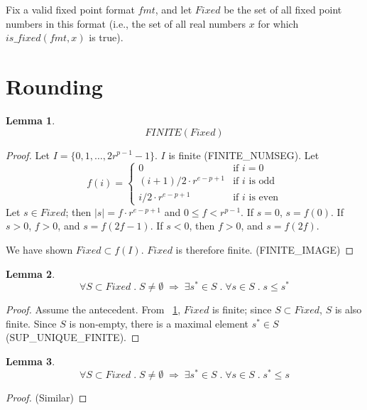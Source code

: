 \documentclass{article}
\begin{document}
\theoremstyle{definition}
\newtheorem{thm}{Theorem}[section]
\newtheorem{lem}[thm]{Lemma}

Fix a valid fixed point format $fmt$, and let $Fixed$ be the set of all 
fixed point numbers in this format (i.e., the set of all real numbers $x$ for 
which $is\_fixed(fmt,x)$ is true).

\section{Rounding}

\begin{lem}
\label{fixedfinite}
\begin{equation*}
FINITE(Fixed)
\end{equation*}
\begin{proof} Let $I = \{0, 1, \ldots, 2r^{p - 1} - 1\}$. $I$ is finite 
(FINITE\_NUMSEG). Let
\begin{equation*}
f(i) = \left \{
\begin{array}{ll}
0 & \text{if $i = 0$}\\
(i + 1)/2 \cdot r^{e - p + 1} & \text{if $i$ is odd}\\
i/2 \cdot r^{e - p + 1} & \text{if $i$ is even}
\end{array} \right .
\end{equation*}
Let $s \in Fixed$; then $|s| = f \cdot r^{e - p + 1}$ and $0 \leq f < r^{p - 1}$.
If $s = 0$, $s = f(0)$. If $s > 0$, $f > 0$, and $s = f(2f - 1)$. If $s < 0$,
then $f > 0$, and $s = f(2f)$.

We have shown $Fixed \subset f(I)$. $Fixed$ is therefore finite. (FINITE\_IMAGE)
\end{proof}
\end{lem}

\begin{lem}
\label{greatestexists}
\begin{equation*}
\forall S \subset Fixed \; . \; S \neq \emptyset \;
\Longrightarrow \; \exists s^* \in S \; . \; \forall s \in S \; . \;
s \leq s^*
\end{equation*}
\begin{proof} Assume the antecedent. From ~\ref{fixedfinite}, $Fixed$ is
finite; since $S \subset Fixed$, $S$ is also finite. Since $S$ is non-empty,
there is a maximal element $s^* \in S$\\
(SUP\_UNIQUE\_FINITE).
\end{proof}
\end{lem}

\begin{lem}
\label{leastexists}
\begin{equation*}
\forall S \subset Fixed \; . \; S \neq \emptyset \;
\Longrightarrow \; \exists s^* \in S \; . \; \forall s \in S \; . \;
s^* \leq s
\end{equation*}
\begin{proof} (Similar)
\end{proof}
\end{lem}
\end{document}
